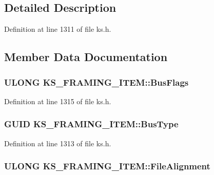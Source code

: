 \subsection{Detailed Description}


Definition at line 1311 of file ks.\+h.



\subsection{Member Data Documentation}
\subsubsection[{\texorpdfstring{Bus\+Flags}{BusFlags}}]{\setlength{\rightskip}{0pt plus 5cm}U\+L\+O\+NG K\+S\+\_\+\+F\+R\+A\+M\+I\+N\+G\+\_\+\+I\+T\+E\+M\+::\+Bus\+Flags}\hypertarget{struct_k_s___f_r_a_m_i_n_g___i_t_e_m_a53ad79998621b3806e74febc8ee19ecd}{}\label{struct_k_s___f_r_a_m_i_n_g___i_t_e_m_a53ad79998621b3806e74febc8ee19ecd}


Definition at line 1315 of file ks.\+h.

\subsubsection[{\texorpdfstring{Bus\+Type}{BusType}}]{\setlength{\rightskip}{0pt plus 5cm}G\+U\+ID K\+S\+\_\+\+F\+R\+A\+M\+I\+N\+G\+\_\+\+I\+T\+E\+M\+::\+Bus\+Type}\hypertarget{struct_k_s___f_r_a_m_i_n_g___i_t_e_m_adb188ca27e6bf1aa7401af7c83d18f4b}{}\label{struct_k_s___f_r_a_m_i_n_g___i_t_e_m_adb188ca27e6bf1aa7401af7c83d18f4b}


Definition at line 1313 of file ks.\+h.

\subsubsection[{\texorpdfstring{File\+Alignment}{FileAlignment}}]{\setlength{\rightskip}{0pt plus 5cm}U\+L\+O\+NG K\+S\+\_\+\+F\+R\+A\+M\+I\+N\+G\+\_\+\+I\+T\+E\+M\+::\+File\+Alignment}\hypertarget{struct_k_s___f_r_a_m_i_n_g___i_t_e_m_ae6a905a4ce7f06859fe6b0d4fb9af782}{}\label{struct_k_s___f_r_a_m_i_n_g___i_t_e_m_ae6a905a4ce7f06859fe6b0d4fb9af782}


